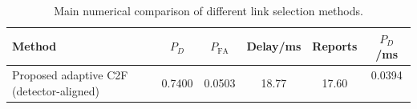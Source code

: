 \begin{table}[t]
    \centering
    \caption{Main numerical comparison of different link selection methods.}
    \label{tab:main_summary}
    \begin{tabular}{l c c c c c}
        \hline
        Method & $P_D$ & $P_{\mathrm{FA}}$ & Delay/ms & Reports & $P_D$/ms \\
        \hline
        Proposed adaptive C2F (detector-aligned) & 0.7400 & 0.0503 & 18.77 & 17.60 & 0.0394 \
        \hline
    \end{tabular}
\end{table}
